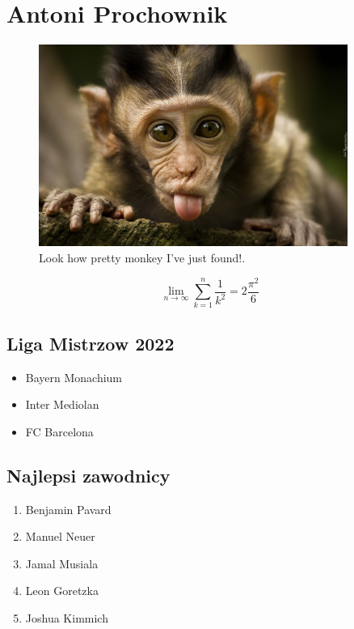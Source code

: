 \hline

\section{Antoni Prochownik}

\label{}




\begin{figure}[h]
    \centering
    \includegraphics[width=0.9\textwidth]{pictures/malpka.jpg}
    \caption{Look how pretty monkey I've just found!.}
    \label{fig:panda}
\end{figure}



$$\lim_{n \to \infty} \sum_{k = 1}^n \frac{1}{k^2} =
2 \frac{\pi^2}{6}$$


\vspace{1cm}

\subsection*{Liga Mistrzow 2022}
\begin{itemize}
    \item Bayern Monachium
    \item Inter Mediolan
    \item FC Barcelona
\end{itemize}
\vspace{2cm}

\subsection*{Najlepsi zawodnicy}
\begin{enumerate}
    \item Benjamin Pavard
    \item Manuel Neuer
    \item Jamal Musiala
    \item Leon Goretzka
    \item Joshua Kimmich
\end{enumerate}

